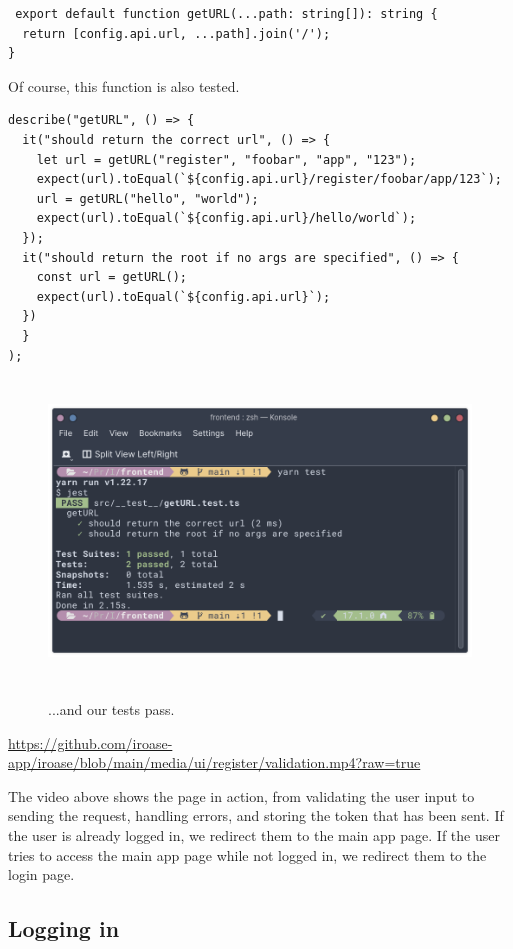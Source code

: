 \documentclass{report}
\begin{document}
\begin{verbatim}
 export default function getURL(...path: string[]): string {
  return [config.api.url, ...path].join('/');
}
\end{verbatim}
Of course, this function is also tested.
\begin{verbatim}
describe("getURL", () => {
  it("should return the correct url", () => {
    let url = getURL("register", "foobar", "app", "123");
    expect(url).toEqual(`${config.api.url}/register/foobar/app/123`);
    url = getURL("hello", "world");
    expect(url).toEqual(`${config.api.url}/hello/world`);
  });
  it("should return the root if no args are specified", () => {
    const url = getURL();
    expect(url).toEqual(`${config.api.url}`);
  })
  }
);
\end{verbatim}
\begin{figure}[H]
  \centering
  \includegraphics[height=8cm]{./media/development/frontend/tests/unit/getURL.png}
  \label{fig:getURL1}
  \caption{...and our tests pass.}
\end{figure}
\href{https://github.com/iroase-app/iroase/blob/main/media/ui/register/validation.mp4?raw=true}{https://github.com/iroase-app/iroase/blob/main/media/ui/register/validation.mp4?raw=true}

The video above shows the page in action, from validating the user input to sending the request, handling errors, and storing the token that has been sent. If the user is already logged in, we redirect them to the main app page. If the user tries to access the main app page while not logged in, we redirect them to the login page.

\subsection{Logging in}
\end{document}
